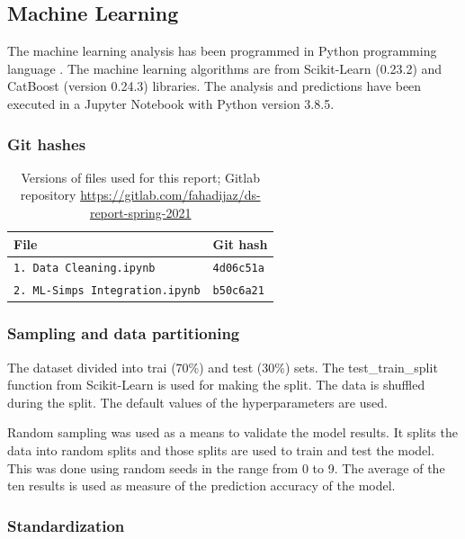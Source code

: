\documentclass[sigconf, nonacm, natbib, screen, balance=False]{acmart}
\begin{document}
\subsection{Machine Learning}\label{sec:ml}

The machine learning analysis has been programmed in Python programming language \citep{python3}. The machine learning algorithms are from Scikit-Learn (0.23.2) \citep{scikit-learn} and CatBoost (version 0.24.3) \citep{cat2018} libraries. The analysis and predictions have been executed in a Jupyter Notebook \citep{Kluyver2016jupyter} with Python version 3.8.5.

\subsubsection{Git hashes}


\begin{table}[h!]
  \caption{Versions of files used for this report; Gitlab repository
    \url{https://gitlab.com/fahadijaz/ds-report-spring-2021}}
  \label{tab:hashes}
  \begin{tabular}{ll}
    \hline
    File & Git hash \\\hline
    \verb!1. Data Cleaning.ipynb! & \verb!4d06c51a! \\
    \verb!2. ML-Simps Integration.ipynb! & \verb!b50c6a21! \\ \hline
  \end{tabular}
\end{table}


\subsubsection{Sampling and data partitioning}\label{sec:sampling}

The dataset divided into trai (70\%) and test (30\%) sets. The test\_train\_split function from Scikit-Learn is used for making the split. The data is shuffled during the split. The default values of the hyperparameters are used.

Random sampling was used as a means to validate the model results. It splits the data into random splits and those splits are used to train and test the model. This was done using random seeds in the range from 0 to 9. The average of the ten results is used as measure of the prediction accuracy of the model.

\subsubsection{Standardization}\label{sec:standardization}
\end{document}
